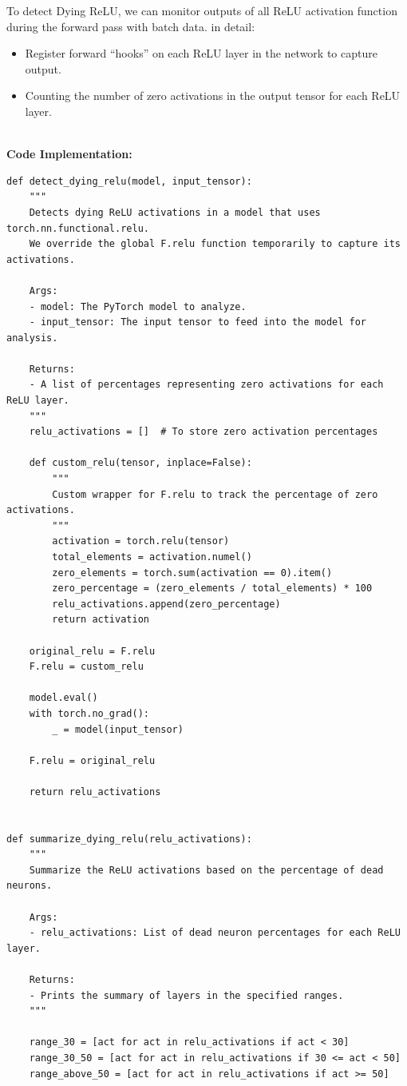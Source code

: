 \documentclass[11pt, oneside]{article}   	%
\begin{document}
To detect Dying ReLU, we can monitor outputs of all ReLU activation function during the forward pass with batch data. in detail:
\begin{itemize}
    \item Register forward ``hooks'' on each ReLU layer in the network to capture output.
    \item Counting the number of zero activations in the output tensor for each ReLU layer.
\end{itemize}
\\
\textbf{Code Implementation: }
\begin{verbatim}
def detect_dying_relu(model, input_tensor):
    """
    Detects dying ReLU activations in a model that uses torch.nn.functional.relu.
    We override the global F.relu function temporarily to capture its activations.
    
    Args:
    - model: The PyTorch model to analyze.
    - input_tensor: The input tensor to feed into the model for analysis.
    
    Returns:
    - A list of percentages representing zero activations for each ReLU layer.
    """
    relu_activations = []  # To store zero activation percentages

    def custom_relu(tensor, inplace=False):
        """
        Custom wrapper for F.relu to track the percentage of zero activations.
        """
        activation = torch.relu(tensor)
        total_elements = activation.numel()
        zero_elements = torch.sum(activation == 0).item()
        zero_percentage = (zero_elements / total_elements) * 100
        relu_activations.append(zero_percentage)
        return activation

    original_relu = F.relu  
    F.relu = custom_relu  

    model.eval()
    with torch.no_grad():
        _ = model(input_tensor)

    F.relu = original_relu  

    return relu_activations


def summarize_dying_relu(relu_activations):
    """
    Summarize the ReLU activations based on the percentage of dead neurons.
    
    Args:
    - relu_activations: List of dead neuron percentages for each ReLU layer.
    
    Returns:
    - Prints the summary of layers in the specified ranges.
    """
    
    range_30 = [act for act in relu_activations if act < 30]
    range_30_50 = [act for act in relu_activations if 30 <= act < 50]
    range_above_50 = [act for act in relu_activations if act >= 50]


\end{verbatim}
\end{document}
